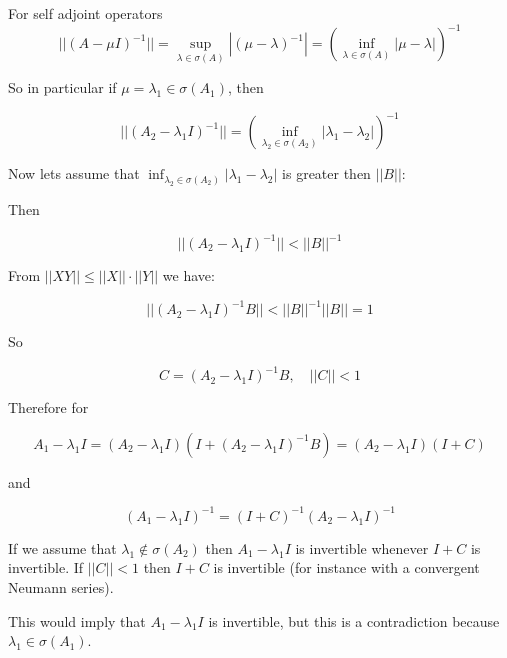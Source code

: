 \documentclass{article}
\theoremstyle{definition}
\begin{document}
For self adjoint operators
\begin{equation}
    ||(A - \mu I)^{-1}|| = \sup_{\lambda \in \sigma(A)} |(\mu - \lambda)^{-1}|
    =
    \left ( \inf_{\lambda \in \sigma(A)} |\mu - \lambda| \right )^{-1}
\end{equation}

So in particular if $\mu=\lambda_1 \in \sigma(A_1)$, then 

\begin{equation}
    ||(A_2 - \lambda_1 I)^{-1}|| 
    =
    \left ( \inf_{\lambda_2 \in \sigma(A_2)} |\lambda_1 - \lambda_2| \right )^{-1}
\end{equation}

Now lets assume that $\inf_{\lambda_2 \in \sigma(A_2)} |\lambda_1 - \lambda_2|$ is greater then $||B||$:

Then 

\begin{equation}
    ||(A_2 - \lambda_1 I)^{-1}||  < ||B||^{-1}
\end{equation}

From $||X Y|| \le ||X|| \cdot ||Y||$ we have:

\begin{equation}
    ||(A_2 - \lambda_1 I)^{-1} B||  < ||B||^{-1} ||B|| = 1
\end{equation}

So

\begin{equation}
    C=(A_2 - \lambda_1 I)^{-1} B, \quad ||C|| < 1
\end{equation}

Therefore for 

\begin{equation}
    A_1 - \lambda_1 I 
    =
    (A_2-\lambda_1 I)
    (I+(A_2-\lambda_1 I)^{-1}B)
    =
    (A_2-\lambda_1 I) (I+C)
\end{equation}

and 

\begin{equation}
    \left ( A_1 - \lambda_1 I \right )^{-1}
    =
    (I+C)^{-1}
    (A_2-\lambda_1 I)^{-1}
\end{equation}

If we assume that $\lambda_1 \notin \sigma(A_2)$ then $A_1 - \lambda_1 I$ is invertible whenever $I+C$ is invertible.
If $||C||<1$ then $I+C$ is invertible (for instance with a convergent Neumann series).

This would imply that $A_1 - \lambda_1 I $ is invertible, but this is a contradiction because $\lambda_1 \in\sigma(A_1)$.
\end{document}
